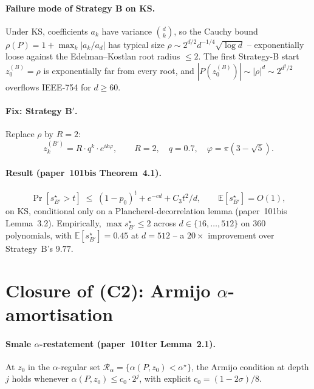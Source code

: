 \documentclass[11pt,a4paper]{article}
\begin{document}
\paragraph{Failure mode of Strategy B on KS.} Under KS, coefficients $a_k$ have variance $\binom{d}{k}$, so the Cauchy bound
$\rho(P) = 1 + \max_k|a_k/a_d|$ has typical size $\rho \sim 2^{d/2} d^{-1/4}\sqrt{\log d}$ -- exponentially loose against the Edelman--Kostlan root radius $\le 2$. The first Strategy-B start $z_0^{(B)} = \rho$ is exponentially far from every root, and $|P(z_0^{(B)})| \sim |\rho|^d \sim 2^{d^2/2}$ overflows IEEE-754 for $d \ge 60$.

\paragraph{Fix: Strategy B$'$.} Replace $\rho$ by $R = 2$:
\begin{equation}\label{eq:Bprime}
z_k^{(B')} = R \cdot q^k \cdot e^{i k \varphi}, \qquad R = 2, \quad q = 0.7, \quad \varphi = \pi(3-\sqrt 5).
\end{equation}

\paragraph{Result (paper~101bis Theorem~4.1).}
\begin{equation}\label{eq:sstar}
\Pr[s^\star_{B'} > t] \;\le\; (1 - p_0)^t + e^{-cd} + C_3 t^2/d, \qquad \mathbb{E}[s^\star_{B'}] = O(1),
\end{equation}
on KS, conditional only on a Plancherel-decorrelation lemma (paper~101bis Lemma~3.2). Empirically, $\max s^\star_{B'} \le 2$ across $d \in \{16, \dots, 512\}$ on $360$ polynomials, with $\mathbb{E}[s^\star_{B'}] = 0.45$ at $d = 512$ -- a $20\times$ improvement over Strategy~B's $9.77$.

\section{Closure of (C2): Armijo $\alpha$-amortisation}\label{sec:Armijo}

\paragraph{Smale $\alpha$-restatement (paper~101ter Lemma~2.1).}
At $z_0$ in the $\alpha$-regular set $\mathcal{R}_\alpha = \{\alpha(P, z_0) < \alpha^\star\}$, the Armijo condition at depth $j$ holds whenever $\alpha(P, z_0) \le c_0 \cdot 2^j$, with explicit $c_0 = (1 - 2\sigma)/8$.
\end{document}
